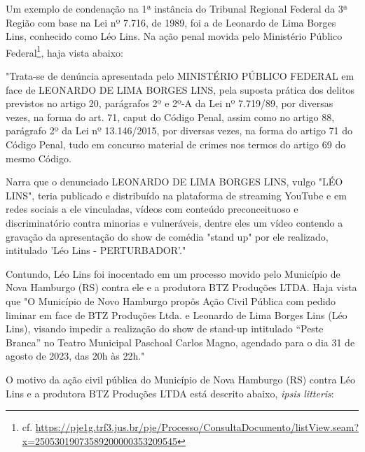 Um exemplo de condenação na 1ª instância do Tribunal Regional Federal da 3ª Região com base na Lei nº 7.716, de 1989, foi a de Leonardo de Lima Borges Lins, conhecido como Léo Lins. Na ação penal movida pelo Ministério Público Federal\footnote{cf. \url{https://pje1g.trf3.jus.br/pje/Processo/ConsultaDocumento/listView.seam?x=25053019073589200000353209545}}, haja vista \cite{condenacao_leolins_trf3} abaixo:

\noindent
\begin{flushleft}
	\setlength{\leftskip}{4cm}
	\small
	"Trata-se de denúncia apresentada pelo MINISTÉRIO PÚBLICO FEDERAL em face de LEONARDO DE LIMA BORGES LINS, pela suposta prática dos delitos previstos no artigo 20, parágrafos 2º e 2º-A da Lei nº 7.719/89, por diversas vezes, na forma do art. 71, caput do Código Penal, assim como no artigo 88, parágrafo 2º da Lei nº 13.146/2015, por diversas vezes, na forma do artigo 71 do Código Penal, tudo em concurso material de crimes nos termos do artigo 69 do mesmo Código.
	
	Narra que o denunciado LEONARDO DE LIMA BORGES LINS, vulgo "LÉO LINS", teria publicado e distribuído na plataforma de streaming YouTube e em redes sociais a ele vinculadas, vídeos com conteúdo preconceituoso e discriminatório contra minorias e vulneráveis, dentre eles um vídeo contendo a gravação da apresentação do show de comédia "stand up" por ele realizado, intitulado 'Léo Lins - PERTURBADOR'." \cite{condenacao_leolins_trf3}
\end{flushleft}

Contundo, Léo Lins foi inocentado em um processo movido pelo Município de Nova Hamburgo (RS) contra ele e a produtora BTZ Produções LTDA. Haja vista \cite{liberdade_expressao_artistica_tjrs} que "O Município de Novo Hamburgo propôs Ação Civil Pública com pedido liminar em face de BTZ Produções Ltda. e Leonardo de Lima Borges Lins (Léo Lins), visando impedir a realização do show de stand-up intitulado “Peste Branca” no Teatro Municipal Paschoal Carlos Magno, agendado para o dia 31 de agosto de 2023, das 20h às 22h."

O motivo da ação civil pública do Município de Nova Hamburgo (RS) contra Léo Lins e a produtora BTZ Produções LTDA está descrito abaixo, \textit{ipsis litteris}:

